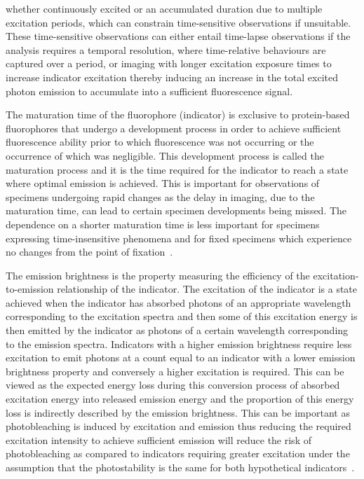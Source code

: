 whether continuously excited or an accumulated duration due to multiple excitation periods, which can constrain time-sensitive observations if unsuitable. These time-sensitive observations can either entail time-lapse observations if the analysis requires a temporal resolution, where time-relative behaviours are captured over a period, or imaging with longer excitation exposure times to increase indicator excitation thereby inducing an increase in the total excited photon emission to accumulate into a sufficient fluorescence signal.\par The maturation time of the fluorophore (indicator) is exclusive to protein-based fluorophores that undergo a development process in order to achieve sufficient fluorescence ability prior to which fluorescence was not occurring or the occurrence of which was negligible. This development process is called the maturation process and it is the time required for the indicator to reach a state where optimal emission is achieved. This is important for observations of specimens undergoing rapid changes as the delay in imaging, due to the maturation time, can lead to certain specimen developments being missed. The dependence on a shorter maturation time is less important for specimens expressing time-insensitive phenomena and for fixed specimens which experience no changes from the point of fixation~\cite{fluorophorePick, matureFluoro}.\par The emission brightness is the property measuring the efficiency of the excitation-to-emission relationship of the indicator. The excitation of the indicator is a state achieved when the indicator has absorbed photons of an appropriate wavelength corresponding to the excitation spectra and then some of this excitation energy is then emitted by the indicator as photons of a certain wavelength corresponding to the emission spectra. Indicators with a higher emission brightness require less excitation to emit photons at a count equal to an indicator with a lower emission brightness property and conversely a higher excitation is required. This can be viewed as the expected energy loss during this conversion process of absorbed excitation energy into released emission energy and the proportion of this energy loss is indirectly described by the emission brightness. This can be important as photobleaching is induced by excitation and emission thus reducing the required excitation intensity to achieve sufficient emission will reduce the risk of photobleaching as compared to indicators requiring greater excitation under the assumption that the photostability is the same for both hypothetical indicators~\cite{fluorophorePick}.

